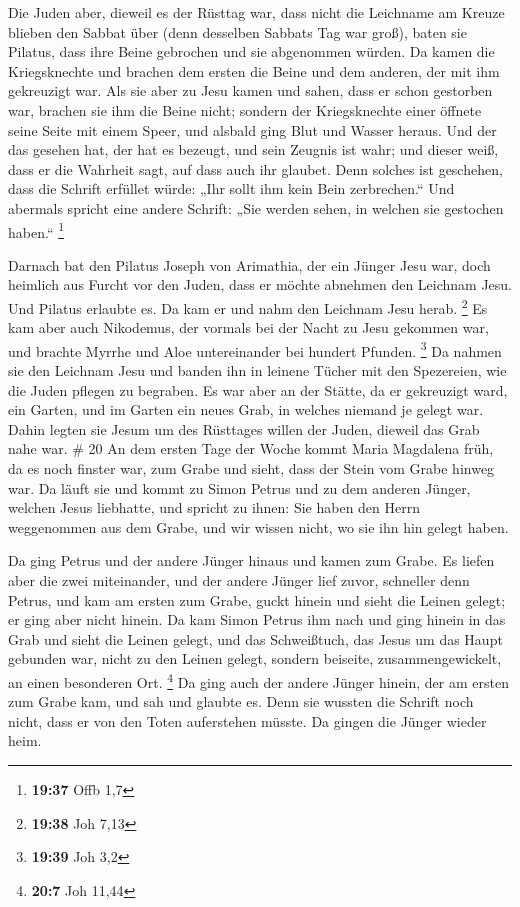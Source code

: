  Die Juden aber, dieweil es der Rüsttag war, dass nicht die
Leichname am Kreuze blieben den Sabbat über (denn desselben Sabbats Tag
war groß), baten sie Pilatus, dass ihre Beine gebrochen und sie
abgenommen würden.  Da kamen die Kriegsknechte und brachen
dem ersten die Beine und dem anderen, der mit ihm gekreuzigt war.
 Als sie aber zu Jesu kamen und sahen, dass er schon
gestorben war, brachen sie ihm die Beine nicht;  sondern
der Kriegsknechte einer öffnete seine Seite mit einem Speer, und alsbald
ging Blut und Wasser heraus.  Und der das gesehen hat, der
hat es bezeugt, und sein Zeugnis ist wahr; und dieser weiß, dass er die
Wahrheit sagt, auf dass auch ihr glaubet.  Denn solches ist
geschehen, dass die Schrift erfüllet würde: „Ihr sollt ihm kein Bein
zerbrechen.``  Und abermals spricht eine andere Schrift:
„Sie werden sehen, in welchen sie gestochen haben.`` \footnote{\textbf{19:37}
  Offb 1,7}

 Darnach bat den Pilatus Joseph von Arimathia, der ein
Jünger Jesu war, doch heimlich aus Furcht vor den Juden, dass er möchte
abnehmen den Leichnam Jesu. Und Pilatus erlaubte es. Da kam er und nahm
den Leichnam Jesu herab. \footnote{\textbf{19:38} Joh 7,13}
 Es kam aber auch Nikodemus, der vormals bei der Nacht zu
Jesu gekommen war, und brachte Myrrhe und Aloe untereinander bei hundert
Pfunden. \footnote{\textbf{19:39} Joh 3,2}  Da nahmen sie
den Leichnam Jesu und banden ihn in leinene Tücher mit den Spezereien,
wie die Juden pflegen zu begraben.  Es war aber an der
Stätte, da er gekreuzigt ward, ein Garten, und im Garten ein neues Grab,
in welches niemand je gelegt war.  Dahin legten sie Jesum
um des Rüsttages willen der Juden, dieweil das Grab nahe war. \# 20
 An dem ersten Tage der Woche kommt Maria Magdalena früh, da
es noch finster war, zum Grabe und sieht, dass der Stein vom Grabe
hinweg war.  Da läuft sie und kommt zu Simon Petrus und zu
dem anderen Jünger, welchen Jesus liebhatte, und spricht zu ihnen: Sie
haben den Herrn weggenommen aus dem Grabe, und wir wissen nicht, wo sie
ihn hin gelegt haben.

 Da ging Petrus und der andere Jünger hinaus und kamen zum
Grabe.  Es liefen aber die zwei miteinander, und der andere
Jünger lief zuvor, schneller denn Petrus, und kam am ersten zum Grabe,
 guckt hinein und sieht die Leinen gelegt; er ging aber
nicht hinein.  Da kam Simon Petrus ihm nach und ging hinein
in das Grab und sieht die Leinen gelegt,  und das
Schweißtuch, das Jesus um das Haupt gebunden war, nicht zu den Leinen
gelegt, sondern beiseite, zusammengewickelt, an einen besonderen Ort.
\footnote{\textbf{20:7} Joh 11,44}  Da ging auch der andere
Jünger hinein, der am ersten zum Grabe kam, und sah und glaubte es.
 Denn sie wussten die Schrift noch nicht, dass er von den
Toten auferstehen müsste.  Da gingen die Jünger wieder
heim.

